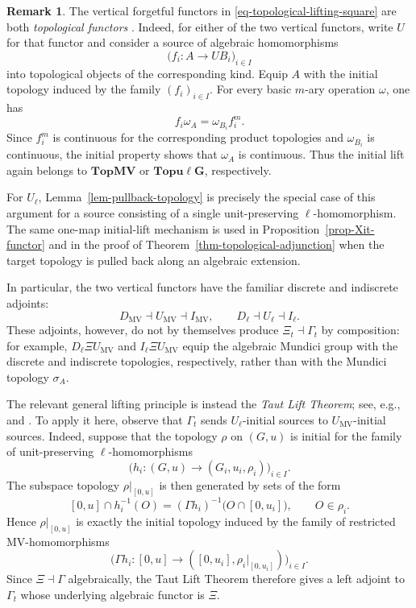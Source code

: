 \documentclass[preprint,3p]{elsarticle}
\theoremstyle{plain}
\theoremstyle{definition}
\newtheorem{rem}[thm]{Remark}
\newcommand{\TopMV}{\mathbf{TopMV}}
\newcommand{\Topulg}{\mathbf{Topu\ell G}}
\numberwithin{equation}{section}
\begin{document}
\begin{rem}
\label{rem-taut-lift}
The vertical forgetful functors in
\eqref{eq-topological-lifting-square} are both \emph{topological functors} 
\cite{Adamek1990,Hofmann2014}.
Indeed, for either of the two vertical functors, write $U$ for that
functor and consider a source of algebraic homomorphisms
\[
 \bigl(f_i\colon A\longrightarrow U B_i\bigr)_{i\in I}
\]
into topological objects of the corresponding kind.
Equip $A$ with the initial topology induced by the family
$(f_i)_{i\in I}$.  For every basic $m$-ary
operation $\omega$, one has
\[
 f_i\omega_A=\omega_{B_i}f_i^m.
\]
Since $f_i^m$ is continuous for the corresponding product topologies and
$\omega_{B_i}$ is continuous, the initial property shows that
$\omega_A$ is continuous.  Thus the initial lift again belongs to
$\TopMV$ or $\Topulg$, respectively.

For $U_{\ell}$, Lemma~\ref{lem-pullback-topology} is precisely the
special case of this argument for a source consisting of a single
unit-preserving $\ell$-homomorphism.  The same one-map initial-lift
mechanism is used in Proposition~\ref{prop-Xit-functor} and in the proof
of Theorem~\ref{thm-topological-adjunction} when the target topology is
pulled back along an algebraic extension.

In particular, the two vertical functors have the familiar discrete and
indiscrete adjoints:
\[
 D_{\mathrm{MV}}\dashv U_{\mathrm{MV}}\dashv I_{\mathrm{MV}},
 \qquad
 D_{\ell}\dashv U_{\ell}\dashv I_{\ell}.
\]
These adjoints, however, do not by themselves produce
$\Xi_t\dashv\Gamma_t$ by composition: for example,
$D_{\ell}\Xi U_{\mathrm{MV}}$ and
$I_{\ell}\Xi U_{\mathrm{MV}}$ equip the algebraic Mundici group with
the discrete and indiscrete topologies, respectively, rather than with
the Mundici topology $\sigma_A$.

The relevant general lifting principle is instead the
\emph{Taut Lift Theorem}; see, e.g.,
\cite[Theorem~21.28]{Adamek1990} and
\cite[Theorem~II.5.11.1]{Hofmann2014}.
To apply it here, observe that $\Gamma_t$ sends
$U_{\ell}$-initial sources to $U_{\mathrm{MV}}$-initial sources.
Indeed, suppose that the topology $\rho$ on $(G,u)$ is initial
for the family of unit-preserving $\ell$-homomorphisms
\[
 \bigl(h_i\colon(G,u)\longrightarrow(G_i,u_i,\rho_i)\bigr)_{i\in I}.
\]
The subspace topology $\rho|_{[0,u]}$ is then generated by sets of the
form
\[
 [0,u]\cap h_i^{-1}(O)
 =
 (\Gamma h_i)^{-1}\bigl(O\cap[0,u_i]\bigr),
 \qquad O\in\rho_i.
\]
Hence $\rho|_{[0,u]}$ is exactly the initial topology induced by
the family of restricted MV-homomorphisms
\[
 \bigl(\Gamma h_i\colon
 [0,u]\longrightarrow([0,u_i],\rho_i|_{[0,u_i]})\bigr)_{i\in I}.
\]
Since $\Xi\dashv\Gamma$ algebraically, the Taut Lift Theorem therefore
gives a left adjoint to $\Gamma_t$ whose underlying algebraic functor is
$\Xi$.


\end{rem}
\end{document}
